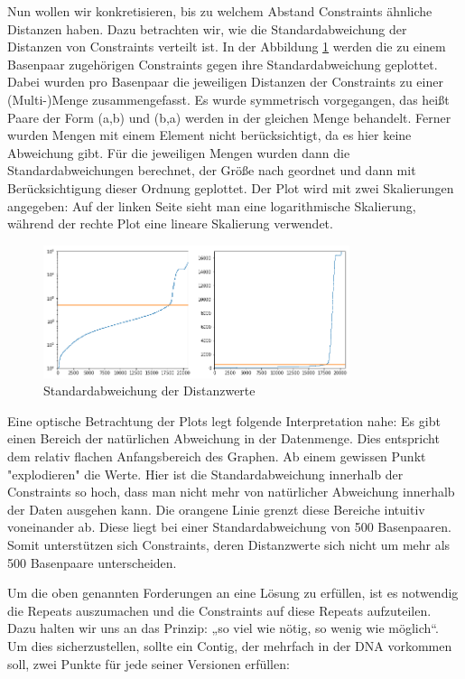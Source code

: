 Nun wollen wir konkretisieren, bis zu welchem Abstand Constraints ähnliche Distanzen haben. Dazu betrachten wir, wie die Standardabweichung der Distanzen von Constraints verteilt ist.
In der Abbildung \ref{std} werden die zu einem Basenpaar zugehörigen Constraints gegen ihre Standardabweichung geplottet. 
Dabei wurden pro Basenpaar die jeweiligen Distanzen der Constraints zu einer (Multi-)Menge zusammengefasst. Es wurde symmetrisch vorgegangen, das heißt Paare der Form (a,b) und (b,a) werden in der gleichen Menge behandelt. Ferner wurden Mengen mit einem Element nicht berücksichtigt, da es hier keine Abweichung gibt. Für die jeweiligen Mengen wurden dann die Standardabweichungen berechnet, der Größe nach geordnet und dann mit Berücksichtigung dieser Ordnung geplottet.
Der Plot wird mit zwei Skalierungen angegeben: Auf der linken Seite sieht man eine logarithmische Skalierung, während der rechte Plot eine lineare Skalierung verwendet.

\begin{figure}
	\begin{center}
		\includegraphics[width=0.8\textwidth]{bilder/std}
	\end{center}
	\caption{Standardabweichung der Distanzwerte}
	\label{std}
\end{figure}




Eine optische Betrachtung der Plots legt folgende Interpretation nahe: 
Es gibt einen Bereich der natürlichen Abweichung in der Datenmenge. Dies entspricht dem relativ flachen Anfangsbereich des Graphen. Ab einem gewissen Punkt "explodieren" die Werte. Hier ist die Standardabweichung innerhalb der Constraints so hoch, dass man nicht mehr von natürlicher Abweichung innerhalb der Daten ausgehen kann. Die orangene Linie grenzt diese Bereiche intuitiv voneinander ab. 
Diese liegt bei einer Standardabweichung von 500 Basenpaaren. 
Somit unterstützen sich Constraints, deren Distanzwerte sich nicht um mehr als 500 Basenpaare unterscheiden.

Um die oben genannten Forderungen an eine Lösung zu erfüllen, ist es notwendig die Repeats auszumachen und die Constraints auf diese Repeats aufzuteilen. Dazu halten wir uns an das Prinzip: „so viel wie nötig, so wenig wie möglich“.
Um dies sicherzustellen, sollte ein Contig, der mehrfach in der DNA vorkommen soll, zwei Punkte für jede seiner Versionen erfüllen:

